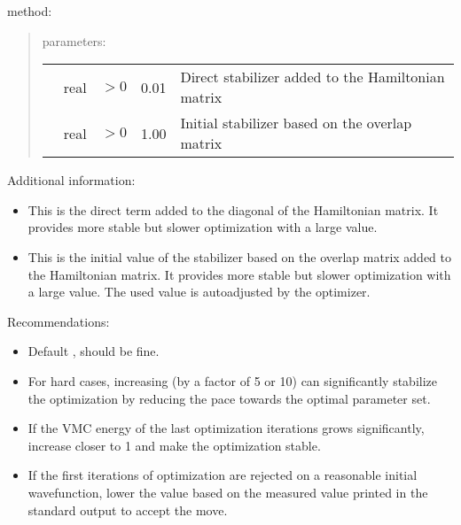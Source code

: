 \documentclass[letterpaper,10pt,english]{sphinxmanual}
\begin{document}
 method:
\begin{quote}

parameters:


\begin{savenotes}\sphinxattablestart
\centering
\begin{tabulary}{\linewidth}[t]{|T|T|T|T|T|}
\hline
\sphinxstyletheadfamily 
{}
&\sphinxstyletheadfamily 
{}
&\sphinxstyletheadfamily 
{}
&\sphinxstyletheadfamily 
{}
&\sphinxstyletheadfamily 
{}
\\
\hline
{}
&
real
&
\(> 0\)
&
0.01
&
Direct stabilizer added to the Hamiltonian matrix
\\
\hline
{}
&
real
&
\(> 0\)
&
1.00
&
Initial stabilizer based on the overlap matrix
\\
\hline
\end{tabulary}
\par
\sphinxattableend\end{savenotes}
\end{quote}

Additional information:
\begin{itemize}
\item {} 
 This is the direct term added to the diagonal of the Hamiltonian
matrix. It provides more stable but slower optimization with a large
value.

\item {} 
 This is the initial value of the stabilizer based on the overlap
matrix added to the Hamiltonian matrix. It provides more stable but
slower optimization with a large value. The used value is
auto\sphinxhyphen{}adjusted by the optimizer.

\end{itemize}

Recommendations:
\begin{itemize}
\item {} 
Default ,  should be fine.

\item {} 
For hard cases, increasing  (by a factor of 5 or 10) can significantly stabilize the optimization by reducing the pace towards the optimal parameter set.

\item {} 
If the VMC energy of the last optimization iterations grows significantly, increase  closer to 1 and make the optimization stable.

\item {} 
If the first iterations of optimization are rejected on a reasonable initial wavefunction,
lower the  value based on the measured value printed in the standard output to accept the move.

\end{itemize}
\end{document}
